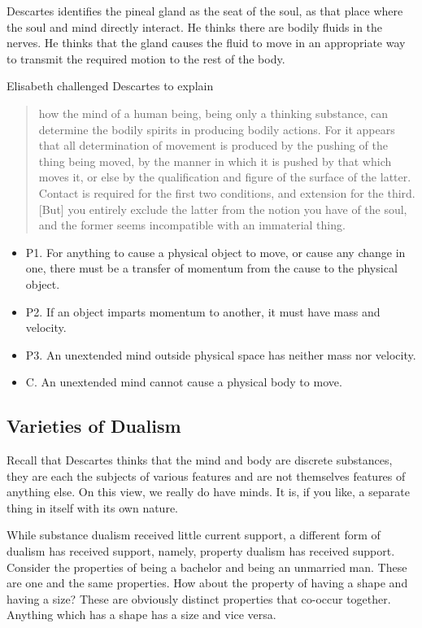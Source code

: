 \documentclass[]{article}
\begin{document}
Descartes identifies the pineal gland as the seat of the soul, as that
place where the soul and mind directly interact. He thinks there are
bodily fluids in the nerves. He thinks that the gland causes the fluid
to move in an appropriate way to transmit the required motion to the
rest of the body.

Elisabeth challenged Descartes to explain

\begin{quote}
how the mind of a human being, being only a thinking substance, can
determine the bodily spirits in producing bodily actions. For it appears
that all determination of movement is produced by the pushing of the
thing being moved, by the manner in which it is pushed by that which
moves it, or else by the qualification and figure of the surface of the
latter. Contact is required for the first two conditions, and extension
for the third. {[}But{]} you entirely exclude the latter from the notion
you have of the soul, and the former seems incompatible with an
immaterial thing.
\end{quote}

\begin{itemize}
\itemsep1pt\parskip0pt
\item
  P1. For anything to cause a physical object to move, or cause any
  change in one, there must be a transfer of momentum from the cause to
  the physical object.
\item
  P2. If an object imparts momentum to another, it must have mass and
  velocity.
\item
  P3. An unextended mind outside physical space has neither mass nor
  velocity.
\item
  C. An unextended mind cannot cause a physical body to move.
\end{itemize}

\subsection{Varieties of Dualism}\label{varieties-of-dualism}

Recall that Descartes thinks that the mind and body are discrete
substances, they are each the subjects of various features and are not
themselves features of anything else. On this view, we really do have
minds. It is, if you like, a separate thing in itself with its own
nature.

While substance dualism received little current support, a different
form of dualism has received support, namely, property dualism has
received support. Consider the properties of being a bachelor and being
an unmarried man. These are one and the same properties. How about the
property of having a shape and having a size? These are obviously
distinct properties that co-occur together. Anything which has a shape
has a size and vice versa.
\end{document}
